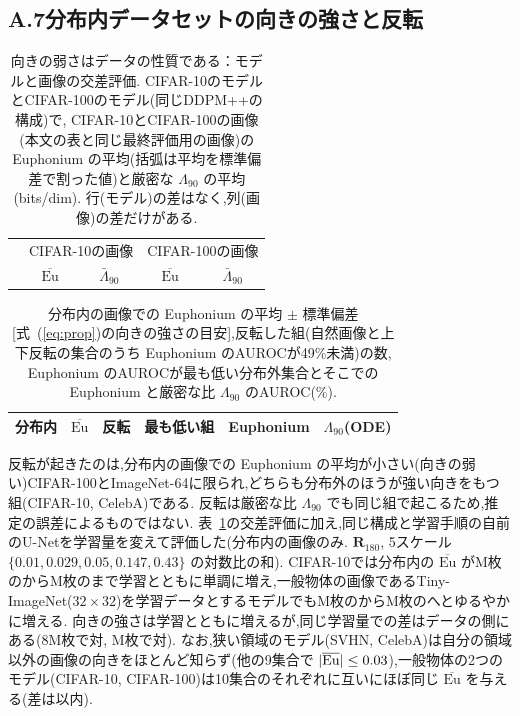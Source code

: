 \documentclass[MIRU,submit,onecolumn]{miru2025j}
\newcommand{\Rot}[1]{\mathbf{R}_{#1}}
\newcommand{\Eu}{\mathrm{Eu}}        %
\renewcommand{\eqref}[1]{(\ref{#1})}   %
\begin{document}
\subsection*{A.7\quad 分布内データセットの向きの強さと反転}
\begin{table}[h]\centering\footnotesize\setlength{\tabcolsep}{3pt}
\caption{向きの弱さはデータの性質である：モデルと画像の交差評価. CIFAR-10のモデルとCIFAR-100のモデル(同じDDPM++の構成)で, CIFAR-10とCIFAR-100の画像(本文の表と同じ最終評価用の画像)の Euphonium の平均(括弧は平均を標準偏差で割った値)と厳密な $\Lambda_{90}$ の平均(bits/dim). 行(モデル)の差はなく,列(画像)の差だけがある.}
\label{tab:cross}
\begin{adjustbox}{max width=\columnwidth}
\begin{tabular}{@{}lcccc@{}}\toprule
 & \multicolumn{2}{c}{CIFAR-10の画像} & \multicolumn{2}{c}{CIFAR-100の画像}\\
\cmidrule(lr){2-3}\cmidrule(lr){4-5}
 & $\overline{\Eu}$ & $\bar\Lambda_{90}$ & $\overline{\Eu}$ & $\bar\Lambda_{90}$\\\midrule

\end{tabular}
\end{adjustbox}
\end{table}
\begin{table}[h]\centering\footnotesize\setlength{\tabcolsep}{3pt}
\caption{分布内の画像での Euphonium の平均 $\pm$ 標準偏差[式~\eqref{eq:prop}の向きの強さの目安],反転した組(自然画像と上下反転の集合のうち Euphonium のAUROCが49\%未満)の数, Euphonium のAUROCが最も低い分布外集合とそこでの Euphonium と厳密な比 $\Lambda_{90}$ のAUROC(\%).}
\label{tab:orient}
\begin{adjustbox}{max width=\columnwidth}
\begin{tabular}{@{}lcclcc@{}}\toprule
分布内 & $\overline{\Eu}$ & 反転 & 最も低い組 & Euphonium & $\Lambda_{90}$(ODE)\\\midrule

\end{tabular}
\end{adjustbox}
\end{table}
反転が起きたのは,分布内の画像での Euphonium の平均が小さい(向きの弱い)CIFAR-100とImageNet-64に限られ,どちらも分布外のほうが強い向きをもつ組(CIFAR-10, CelebA)である.%
反転は厳密な比 $\Lambda_{90}$ でも同じ組で起こるため,推定の誤差によるものではない.%
表~\ref{tab:cross}の交差評価に加え,同じ構成と学習手順の自前のU-Netを学習量を変えて評価した(分布内の画像のみ. $\Rot{180}$, 5スケール $\{0.01, 0.029, 0.05, 0.147, 0.43\}$ の対数比の和). %
CIFAR-10では分布内の $\overline{\Eu}$ が\snapNFirstCten{}M枚の\snapFirstCten{}から\snapNLastCten{}M枚の\snapLastCten{}まで学習とともに単調に増え,一般物体の画像であるTiny-ImageNet($32{\times}32$)を学習データとするモデルでも\snapNFirstTIN{}M枚の\snapFirstTIN{}から\snapNLastTIN{}M枚の\snapLastTIN{}へとゆるやかに増える.%
向きの強さは学習とともに増えるが,同じ学習量での差はデータの側にある(8M枚で\snapEightTIN{}対\snapEightCten, \snapNLastTIN{}M枚で\snapLastTIN{}対\snapLastCten).%
なお,狭い領域のモデル(SVHN, CelebA)は自分の領域以外の画像の向きをほとんど知らず(他の9集合で $|\overline{\Eu}|\le\gbarNarrowMax$),一般物体の2つのモデル(CIFAR-10, CIFAR-100)は10集合のそれぞれに互いにほぼ同じ $\overline{\Eu}$ を与える(差は\gbarBroadDiffMax{}以内).
\end{document}
